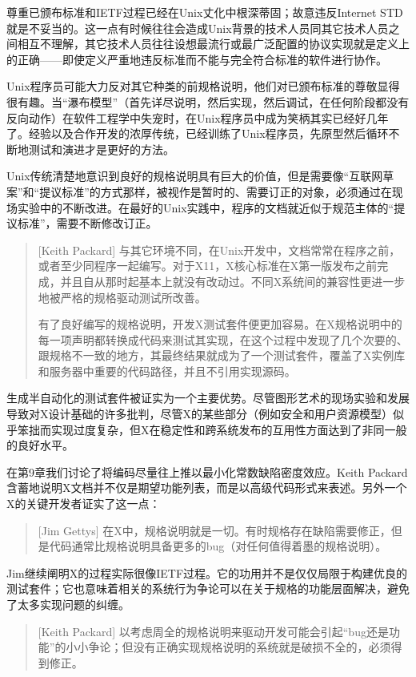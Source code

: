 \documentclass[12pt,oneside]{book}
\begin{document}
\begin{common-format}
尊重已颁布标准和IETF过程已经在Unix丈化中根深蒂固；故意违反Internet STD就是不妥当的。这一点有时候往往会造成Unix背景的技术人员同其它技术人员之间相互不理解，其它技术人员往往设想最流行或最广泛配置的协议实现就是定义上的正确——即使定义严重地违反标准而不能与完全符合标准的软件进行协作。

Unix程序员可能大力反对其它种类的前规格说明，他们对已颁布标准的尊敬显得很有趣。当“瀑布模型”（首先详尽说明，然后实现，然后调试，在任何阶段都没有反向动作）在软件工程学中失宠时，在Unix程序员中成为笑柄其实已经好几年了。经验以及合作开发的浓厚传统，已经训练了Unix程序员，先原型然后循环不断地测试和演进才是更好的方法。

Unix传统清楚地意识到良好的规格说明具有巨大的价值，但是需要像“互联网草案”和“提议标准”的方式那样，被视作是暂时的、需要订正的对象，必须通过在现场实验中的不断改进。在最好的Unix实践中，程序的文档就近似于规范主体的“提议标准”，需要不断修改订正。

\begin{quote}[Keith Packard]
与其它环境不同，在Unix开发中，文档常常在程序之前，或者至少同程序一起编写。对于X11，X核心标准在X第一版发布之前完成，并且自从那时起基本上就没有改动过。不同X系统间的兼容性更进一步地被严格的规格驱动测试所改善。

有了良好编写的规格说明，开发X测试套件便更加容易。在X规格说明中的每一项声明都转换成代码来测试其实现，在这个过程中发现了几个次要的、跟规格不一致的地方，其最终结果就成为了一个测试套件，覆盖了X实例库和服务器中重要的代码路径，并且不引用实现源码。
\end{quote}

生成半自动化的测试套件被证实为一个主要优势。尽管图形艺术的现场实验和发展导致对X设计基础的许多批判，尽管X的某些部分（例如安全和用户资源模型）似乎笨拙而实现过度复杂，但X在稳定性和跨系统发布的互用性方面达到了非同一般的良好水平。

在第9章我们讨论了将编码尽量往上推以最小化常数缺陷密度效应。Keith Packard含蓄地说明X文档并不仅是期望功能列表，而是以高级代码形式来表述。另外一个X的关键开发者证实了这一点：

\begin{quote}[Jim Gettys]
在X中，规格说明就是一切。有时规格存在缺陷需要修正，但是代码通常比规格说明具备更多的bug（对任何值得着墨的规格说明）。
\end{quote}

Jim继续阐明X的过程实际很像IETF过程。它的功用并不是仅仅局限于构建优良的测试套件；它也意味着相关的系统行为争论可以在关于规格的功能层面解决，避免了太多实现问题的纠缠。

\begin{quote}[Keith Packard]
以考虑周全的规格说明来驱动开发可能会引起“bug还是功能”的小小争论；但没有正确实现规格说明的系统就是破损不全的，必须得到修正。


\end{quote}
\end{common-format}
\end{document}
